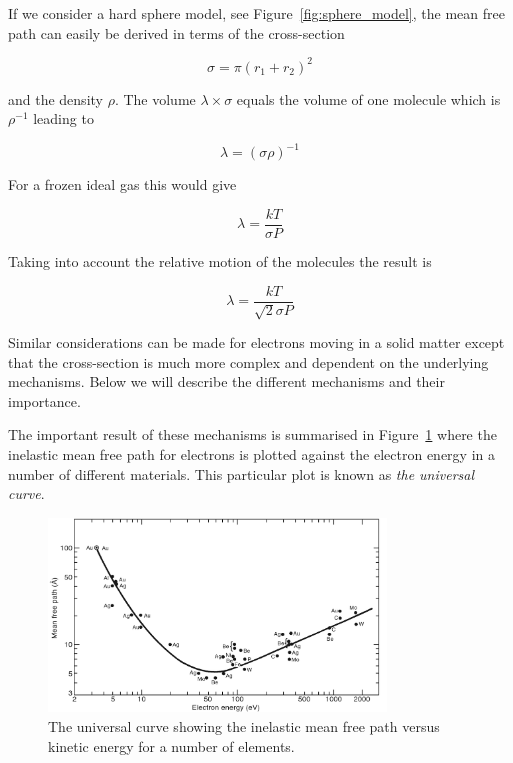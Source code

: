 If we consider a hard sphere model, see Figure~\ref{fig:sphere_model}, the mean free path can easily be derived in terms of the cross-section

\begin{equation}
\sigma =\pi (r_1+r_2)^2
\end{equation}

\noindent and the density $\rho$. The volume $\lambda \times \sigma$ equals the volume of one molecule which is $\rho^{-1}$ leading to

\begin{equation}
\lambda =(\sigma \rho)^{-1}
\end{equation}

For a frozen ideal gas this would give

\begin{equation}
\lambda =\frac{kT}{\sigma P}
\end{equation}

Taking into account the relative motion of the molecules the result is

\begin{equation}
\lambda =\frac{kT}{\sqrt{2}\sigma P}
\end{equation}

Similar considerations can be made for electrons moving in a solid matter except that the cross-section is much more complex and dependent on the underlying mechanisms. Below we will describe the different mechanisms and their importance.

The important result of these mechanisms is summarised in Figure~\ref{fig:mean_free_path} where the inelastic mean free path for electrons is plotted against the electron energy in a number of different materials. This particular plot is known as \emph{the universal curve}.

\begin{figure}[htbp]
\centering
\includegraphics[width=0.8\textwidth]{figures/universal_curve}
\caption{The universal curve showing the inelastic mean free path versus kinetic energy for a number of elements.\cite{Somorjai_two_dimensions}}
\label{fig:mean_free_path}
\end{figure}

